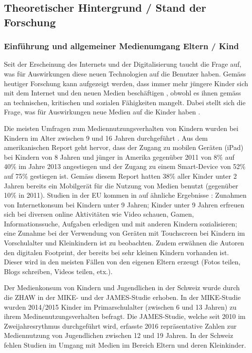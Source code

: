 \subsection{Theoretischer Hintergrund / Stand der Forschung}
\subsubsection{Einführung und allgemeiner Medienumgang Eltern / Kind}
Seit der Erscheinung des Internets und der Digitalisierung taucht die Frage auf, was für Auswirkungen diese neuen Technologien auf die Benutzer haben. Gemäss heutiger Forschung kann aufgezeigt werden, dass immer mehr jüngere Kinder sich mit dem Internet und den neuen Medien beschäftigen \cite{Rideout2013a, Chaudron2015}, obwohl es ihnen gemäss  an technischen, kritischen und sozialen Fähigkeiten mangelt. Dabei stellt sich die Frage, was für Auswirkungen neue Medien auf die Kinder haben \cite{Tomopoulos2010, Pempek2014, Livingstone2015, Masur2015, Troseth2016}. 

Die meisten Umfragen zum Mediennutzungsverhalten von Kindern wurden bei Kindern im Alter zwischen 9 und 16 Jahren durchgeführt \cite{Chaudron2015}. Aus dem amerikanischen Report  geht hervor, dass der Zugang zu mobilen Geräten (iPad) bei Kindern von 8 Jahren und jünger in Amerika gegenüber 2011 von 8\% auf 40\% im Jahre 2013 angestiegen und der Zugang zu einem Smart-Device von 52\% auf 75\% gestiegen ist. Gemäss diesem Report hatten 38\% aller Kinder unter 2 Jahren bereits ein Mobilgerät für die Nutzung von Medien benutzt (gegenüber 10\% in 2011). Studien in der EU kommen in auf ähnliche Ergebnisse \cite{Holloway2013}: Zunahmen von Internetkonsum bei Kindern unter 9 Jahren; Kinder unter 9 Jahren erfreuen sich bei diversen online Aktivitäten wie Video schauen, Gamen, Informationssuche, Aufgaben erledigen und mit anderen Kindern sozialisieren; eine Zunahme bei der Verwendung von Geräten mit Touchscreen bei Kindern im Vorschulalter und Kleinkindern ist zu beobachten. Zudem erwähnen die Autoren den digitalen Footprint, der bereits bei sehr kleinen Kindern vorhanden ist. Dieser wird in den meisten Fällen von den eigenen Eltern erzeugt (Fotos teilen, Blogs schreiben, Videos teilen, etx.).

Der Medienkonsum von Kindern und Jugendlichen in der Schweiz wurde durch die ZHAW in der MIKE- und der JAMES-Studie \cite{Suter2015, Waller2016} erhoben. In der MIKE-Studie wurden 2014/2015 Kinder im Primarschulalter (zwischen 6 und 13 Jahren) zu ihrem Medinenutzungsverhalten befragt. Die JAMES-Studie, welche seit 2010 im Zweijahresrythmus durchgeführt wird, erfasste 2016 repräsentative Zahlen zur Mediennutzung von Jugendlichen zwischen 12 und 19 Jahren. In der Schweiz fehlen Studien im Umgang mit Medien im Bereich Eltern und deren Kleinkinder. 

